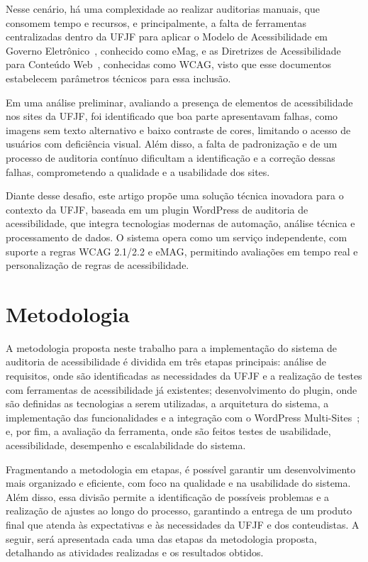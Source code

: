 \documentclass[
	article,			%
	12pt,				%
	oneside,			%
	a4paper,			%
	section=TITLE,		%
	subsection=TITLE,	%
	english,			%
	brazil,				%
	sumario=tradicional
	]{abntex2}
\begin{document}
Nesse cenário, há uma complexidade ao realizar auditorias manuais, que
consomem tempo e recursos, e principalmente, a falta de ferramentas
centralizadas dentro da UFJF para aplicar o Modelo de Acessibilidade em
Governo Eletrônico~\cite{emag}, conhecido como eMag, e as Diretrizes
de Acessibilidade para Conteúdo Web~\cite{wcag22}, conhecidas como
WCAG, visto que esse documentos estabelecem parâmetros técnicos para essa inclusão.

Em uma análise preliminar, avaliando a presença de elementos de acessibilidade nos
sites da UFJF, foi identificado que boa parte apresentavam falhas, como imagens sem texto
alternativo e baixo contraste de cores, limitando o acesso de usuários com deficiência
visual. Além disso, a falta de padronização e de um processo de auditoria contínuo
dificultam a identificação e a correção dessas falhas, comprometendo a qualidade e a
usabilidade dos sites.

Diante desse desafio, este artigo propõe uma solução técnica inovadora
para o contexto da UFJF, baseada em um plugin WordPress de auditoria
de acessibilidade, que integra tecnologias modernas de automação,
análise técnica e processamento de dados. O sistema opera como um serviço
independente, com suporte a regras WCAG 2.1/2.2 e eMAG, permitindo
avaliações em tempo real e personalização de regras de acessibilidade.

\chapter*{Metodologia}\label{sec:metodologia}
A metodologia proposta neste trabalho
para a implementação do sistema de auditoria de acessibilidade é dividida
em três etapas principais: análise de requisitos, onde são identificadas as
necessidades da UFJF e a realização de testes com ferramentas de acessibilidade já
existentes; desenvolvimento do plugin, onde são definidas as tecnologias a serem
utilizadas, a arquitetura do sistema, a implementação das funcionalidades e a
integração com o WordPress Multi-Sites~\cite{wp-ms}; e, por fim,
a avaliação da ferramenta,
onde são feitos testes de usabilidade, acessibilidade, desempenho e
escalabilidade do sistema.

Fragmentando a metodologia em etapas, é possível garantir um desenvolvimento
mais organizado e eficiente, com foco na qualidade e na usabilidade do sistema.
Além disso, essa divisão permite a identificação de possíveis problemas
e a realização de ajustes ao longo do processo, garantindo a entrega de um
produto final que atenda às expectativas e às necessidades da UFJF e dos
conteudistas. A seguir, será apresentada cada uma das etapas da metodologia
proposta, detalhando as atividades realizadas e os resultados obtidos.
\end{document}
